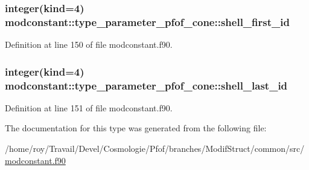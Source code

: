 \hypertarget{structmodconstant_1_1type__parameter__pfof__cone_a51f2b74874730f91a44f714d515fb423}{
\subsubsection[{shell\-\_\-first\-\_\-id}]{\setlength{\rightskip}{0pt plus 5cm}integer(kind=4) modconstant\-::type\-\_\-parameter\-\_\-pfof\-\_\-cone\-::shell\-\_\-first\-\_\-id}}\label{structmodconstant_1_1type__parameter__pfof__cone_a51f2b74874730f91a44f714d515fb423}


Definition at line 150 of file modconstant.\-f90.

\hypertarget{structmodconstant_1_1type__parameter__pfof__cone_a50cff304d33c3b950d4e9f2cb3ffb70d}{
\subsubsection[{shell\-\_\-last\-\_\-id}]{\setlength{\rightskip}{0pt plus 5cm}integer(kind=4) modconstant\-::type\-\_\-parameter\-\_\-pfof\-\_\-cone\-::shell\-\_\-last\-\_\-id}}\label{structmodconstant_1_1type__parameter__pfof__cone_a50cff304d33c3b950d4e9f2cb3ffb70d}


Definition at line 151 of file modconstant.\-f90.



The documentation for this type was generated from the following file\-:\begin{DoxyCompactItemize}
\item 
/home/roy/\-Travail/\-Devel/\-Cosmologie/\-Pfof/branches/\-Modif\-Struct/common/src/\hyperlink{modconstant_8f90}{modconstant.\-f90}\end{DoxyCompactItemize}
